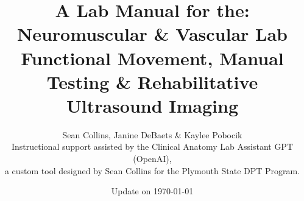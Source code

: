 \documentclass[12pt]{report}
\begin{document}
\title{{\Large A Lab Manual for the:}\\
[0.5em]{\bf \Huge Neuromuscular \& Vascular Lab}\\
[0.5em]{\Large Functional Movement, Manual Testing \& Rehabilitative Ultrasound Imaging}}

\author{Sean Collins, Janine DeBaets \& Kaylee Pobocik \\
{\small Instructional support assisted by the Clinical Anatomy Lab Assistant GPT (OpenAI),}\\
{\small a custom tool designed by Sean Collins for the Plymouth State DPT Program.}}





\date{Update on \today}
\maketitle
 
\setcounter{tocdepth}{2}
\tableofcontents














\end{document}
